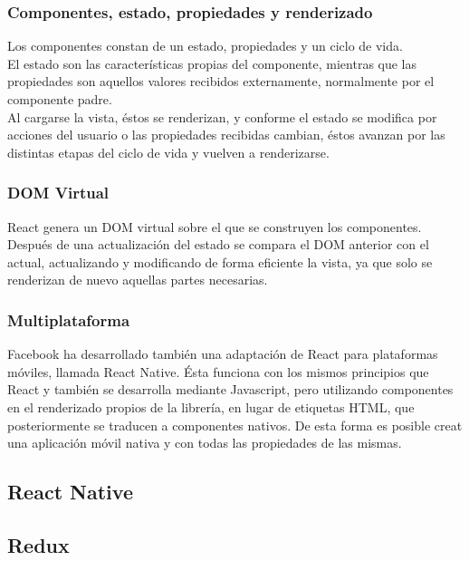 \subsubsection {Componentes, estado, propiedades y renderizado}

Los componentes constan de un estado, propiedades y un ciclo de vida. \\ 
El estado son las características propias del componente, mientras que las propiedades son aquellos valores recibidos externamente, normalmente por el componente padre. \\
Al cargarse la vista, éstos se renderizan, y conforme el estado se modifica por acciones del usuario o las propiedades recibidas cambian, éstos avanzan por las distintas etapas del ciclo de vida y vuelven a renderizarse. \\

\subsubsection {DOM Virtual}

React genera un DOM virtual sobre el que se construyen los componentes. Después de una actualización del estado se compara el DOM anterior con el actual, actualizando y modificando de forma eficiente la vista, ya que solo se renderizan de nuevo aquellas partes necesarias.  \\

\subsubsection {Multiplataforma}

Facebook ha desarrollado también una adaptación de React para plataformas móviles, llamada React Native. Ésta funciona con los mismos principios que React y también se desarrolla mediante Javascript, pero utilizando componentes en el renderizado propios de la librería, en lugar de etiquetas HTML, que posteriormente se traducen a componentes nativos. De esta forma es posible creat una aplicación móvil nativa y con todas las propiedades de las mismas. \\

\subsection {React Native} 

\subsection {Redux}

